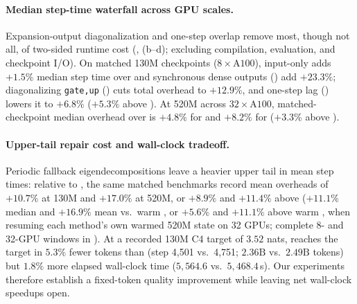 \paragraph{Median step-time waterfall across GPU scales.}
Expansion-output diagonalization and one-step overlap remove most, though not all, of two-sided runtime cost (, (b--d); excluding compilation, evaluation, and checkpoint I/O). On matched 130M checkpoints ($8\times\text{A100}$), input-only  adds $+1.5\%$ median step time over  and synchronous dense outputs () add $+23.3\%$; diagonalizing \texttt{gate,up} () cuts total overhead to $+12.9\%$, and one-step lag () lowers it to $+6.8\%$ ($+5.3\%$ above ). At 520M across $32\times\text{A100}$, matched-checkpoint median overhead over  is $+4.8\%$ for  and $+8.2\%$ for  ($+3.3\%$ above ).



\paragraph{Upper-tail repair cost and wall-clock tradeoff.}
Periodic fallback eigendecompositions leave a heavier upper tail in mean step times: relative to , the same matched benchmarks record mean overheads of $+10.7\%$ at 130M and $+17.0\%$ at 520M, or $+8.9\%$ and $+11.4\%$ above  ($+11.1\%$ median and $+16.9\%$ mean vs.\ warm , or $+5.6\%$ and $+11.1\%$ above warm , when resuming each method's own warmed 520M state on 32 GPUs; complete 8- and 32-GPU windows in ). At a recorded 130M C4 target of $3.52$ nats,  reaches the target in $5.3\%$ fewer tokens than  (step 4,501 vs.\ 4,751; $2.36\text{B}$ vs.\ $2.49\text{B}$ tokens) but $1.8\%$ more elapsed wall-clock time ($5{,}564.6$ vs.\ $5{,}468.4$\,s). Our experiments therefore establish a fixed-token quality improvement while leaving net wall-clock speedups open.
